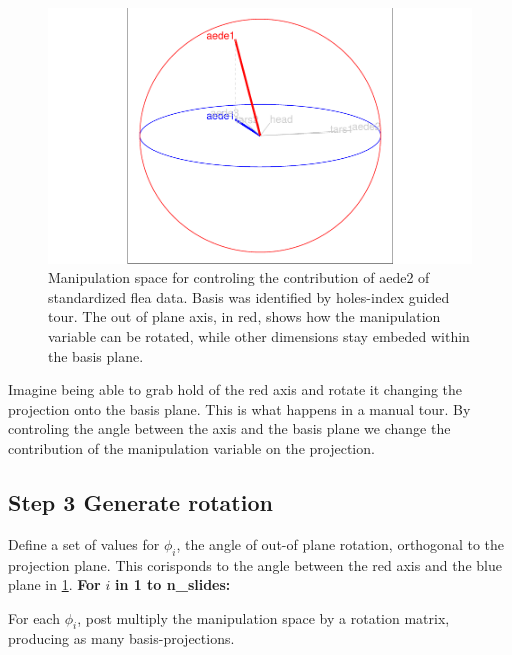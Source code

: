 \documentclass{monashthesis}
\begin{document}
\begin{figure}
\centering
\includegraphics{thesis_files/figure-latex/step2-1.pdf}
\caption{\label{fig:step2}Manipulation space for controling the contribution of aede2 of standardized flea data. Basis was identified by holes-index guided tour. The out of plane axis, in red, shows how the manipulation variable can be rotated, while other dimensions stay embeded within the basis plane.}
\end{figure}

Imagine being able to grab hold of the red axis and rotate it changing the projection onto the basis plane. This is what happens in a manual tour. By controling the angle between the axis and the basis plane we change the contribution of the manipulation variable on the projection.

\hypertarget{step-3-generate-rotation}{%
\subsection{Step 3 Generate rotation}\label{step-3-generate-rotation}}

Define a set of values for \(\phi_i\), the angle of out-of plane rotation, orthogonal to the projection plane. This corisponds to the angle between the red axis and the blue plane in \ref{fig:step2}.
\textbf{For } \(i\) \textbf{in 1 to n\_slides:}

For each \(\phi_i\), post multiply the manipulation space by a rotation matrix, producing as many basis-projections.
\end{document}
